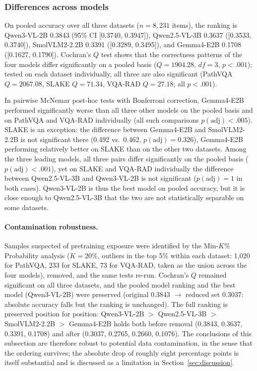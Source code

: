 \subsubsection{Differences across models}

On pooled accuracy over all three datasets ($n = 8{,}231$ items), the ranking is
Qwen3-VL-2B 0.3843 (95\% CI [0.3740, 0.3947]), Qwen2.5-VL-3B 0.3637 ([0.3533,
0.3740]), SmolVLM2-2.2B 0.3391 ([0.3289, 0.3495]), and Gemma4-E2B 0.1708
([0.1627, 0.1790]). Cochran's $Q$ test shows that the correctness patterns of
the four models differ significantly on a pooled basis ($Q = 1904.28$, $df = 3$,
$p < .001$); tested on each dataset individually, all three are also significant
(PathVQA $Q = 2067.08$, SLAKE $Q = 71.34$, VQA-RAD $Q = 27.18$; all $p < .001$).

In pairwise McNemar post-hoc tests with Bonferroni correction, Gemma4-E2B
performed significantly worse than all three other models on the pooled basis and
on PathVQA and VQA-RAD individually (all such comparisons $p(\mathrm{adj}) <
.005$). SLAKE is an exception: the difference between Gemma4-E2B and
SmolVLM2-2.2B is not significant there (0.492 vs.\ 0.462, $p(\mathrm{adj}) =
0.326$), Gemma4-E2B performing relatively better on SLAKE than on the other two
datasets. Among the three leading models, all three pairs differ significantly on
the pooled basis ($p(\mathrm{adj}) < .001$), yet on SLAKE and VQA-RAD
individually the difference between Qwen2.5-VL-3B and Qwen3-VL-2B is not
significant ($p(\mathrm{adj}) = 1$ in both cases). Qwen3-VL-2B is thus the best
model on pooled accuracy, but it is close enough to Qwen2.5-VL-3B that the two
are not statistically separable on some datasets.

\paragraph{Contamination robustness.}
Samples suspected of pretraining exposure were identified by the Min-$K$\%
Probability analysis ($K = 20\%$, outliers in the top 5\% within each dataset:
1,020 for PathVQA, 233 for SLAKE, 73 for VQA-RAD, taken as the union across the
four models), removed, and the same tests re-run. Cochran's $Q$ remained
significant on all three datasets, and the pooled model ranking and the best
model (Qwen3-VL-2B) were preserved (original 0.3843 $\rightarrow$ reduced set
0.3037: absolute accuracy falls but the ranking is unchanged). The full ranking
is preserved position for position: Qwen3-VL-2B $>$ Qwen2.5-VL-3B $>$
SmolVLM2-2.2B $>$ Gemma4-E2B holds both before removal (0.3843, 0.3637, 0.3391,
0.1708) and after (0.3037, 0.2765, 0.2660, 0.1076). The conclusions of this
subsection are therefore robust to potential data contamination, in the sense
that the ordering survives; the absolute drop of roughly eight percentage points
is itself substantial and is discussed as a limitation in
Section~\ref{sec:discussion}.


